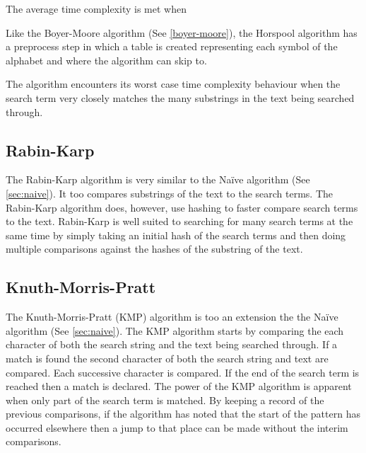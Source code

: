 \documentclass{article}
\begin{document}
The average time complexity is met when 

Like the Boyer-Moore algorithm \citep{Boyer1977} (See \ref{boyer-moore}), the Horspool algorithm has a preprocess step in which a table is created representing each symbol of the alphabet and where the algorithm can skip to.

The algorithm encounters its worst case time complexity behaviour when the search term very closely matches the many substrings in the text being searched through. 

\subsection{Rabin-Karp} \label{sec:rabin-karp}

The Rabin-Karp algorithm \citep{Karp1987} is very similar to the Na{\"i}ve algorithm (See \ref{sec:naive}). It too compares substrings of the text to the search terms. The Rabin-Karp algorithm does, however, use hashing to faster compare search terms to the text. Rabin-Karp is well suited to searching for many search terms at the same time by simply taking an initial hash of the search terms and then doing multiple comparisons against the hashes of the substring of the text.

\subsection{Knuth-Morris-Pratt} \label{sec:knuth-morris-pratt}

The Knuth-Morris-Pratt (KMP) algorithm \cite{Knuth1977} is too an extension the the Na{\"i}ve algorithm (See \ref{sec:naive}). The KMP algorithm starts by comparing the each character of both the search string and the text being searched through. If a match is found the second character of both the search string and text are compared. Each successive character is compared. If the end of the search term is reached then a match is declared. The power of the KMP algorithm is apparent when only part of the search term is matched. By keeping a record of the previous comparisons, if the algorithm has noted that the start of the pattern has occurred elsewhere then a jump to that place can be made without the interim comparisons.
\end{document}
